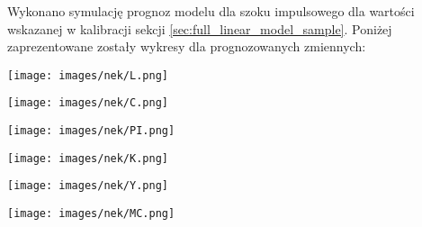 Wykonano symulację prognoz modelu dla szoku impulsowego dla wartości wskazanej w kalibracji sekcji \ref{sec:full_linear_model_sample}. Poniżej zaprezentowane zostały wykresy dla prognozowanych zmiennych:
\begin{center}
    \begin{minipage}{.3\textwidth}
      \centering
      \captionsetup{type=figure}
      \texttt{[image: images/nek/L.png]}
      \label{fig:nek:L}
    \end{minipage}%
    \begin{minipage}{.3\textwidth}
      \centering
      \captionsetup{type=figure}
      \texttt{[image: images/nek/C.png]}
      \label{fig:nek:C}
    \end{minipage}
    \begin{minipage}{.3\textwidth}
      \centering
      \captionsetup{type=figure}
      \texttt{[image: images/nek/PI.png]}
      \label{fig:nek:PI}
    \end{minipage}
\end{center}

\begin{center}
    \begin{minipage}{.3\textwidth}
      \centering
      \captionsetup{type=figure}
      \texttt{[image: images/nek/K.png]}
      \label{fig:nek:K}
    \end{minipage}%
    \begin{minipage}{.3\textwidth}
      \centering
      \captionsetup{type=figure}
      \texttt{[image: images/nek/Y.png]}
      \label{fig:nek:Y}
    \end{minipage}
    \begin{minipage}{.3\textwidth}
      \centering
      \captionsetup{type=figure}
      \texttt{[image: images/nek/MC.png]}
      \label{fig:nek:MC}
    \end{minipage}
\end{center}

